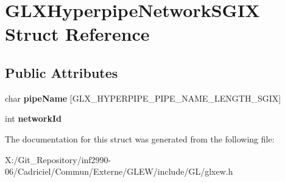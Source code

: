 \hypertarget{struct_g_l_x_hyperpipe_network_s_g_i_x}{\section{G\-L\-X\-Hyperpipe\-Network\-S\-G\-I\-X Struct Reference}
\label{struct_g_l_x_hyperpipe_network_s_g_i_x}
}
\subsection*{Public Attributes}
\begin{DoxyCompactItemize}
\item 
\hypertarget{struct_g_l_x_hyperpipe_network_s_g_i_x_a6338b9717fa895aec16b932f2ef693ed}{char {\bfseries pipe\-Name} \mbox{[}G\-L\-X\-\_\-\-H\-Y\-P\-E\-R\-P\-I\-P\-E\-\_\-\-P\-I\-P\-E\-\_\-\-N\-A\-M\-E\-\_\-\-L\-E\-N\-G\-T\-H\-\_\-\-S\-G\-I\-X\mbox{]}}\label{struct_g_l_x_hyperpipe_network_s_g_i_x_a6338b9717fa895aec16b932f2ef693ed}

\item 
\hypertarget{struct_g_l_x_hyperpipe_network_s_g_i_x_a81393053988b32fadb0b21615024add1}{int {\bfseries network\-Id}}\label{struct_g_l_x_hyperpipe_network_s_g_i_x_a81393053988b32fadb0b21615024add1}

\end{DoxyCompactItemize}


The documentation for this struct was generated from the following file\-:\begin{DoxyCompactItemize}
\item 
X\-:/\-Git\-\_\-\-Repository/inf2990-\/06/\-Cadriciel/\-Commun/\-Externe/\-G\-L\-E\-W/include/\-G\-L/glxew.\-h\end{DoxyCompactItemize}
